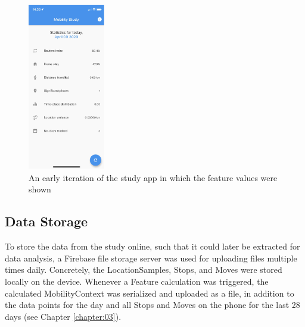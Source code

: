 \begin{figure}[h]
    \centering
    \includegraphics[width=0.3\textwidth]{images/app_imgs/screens-features.pdf}
    \caption{An early iteration of the study app in which the feature values were shown}
    \label{fig:app-features-screen}
\end{figure}

\subsection{Data Storage}
To store the data from the study online, such that it could later be extracted for data analysis, a Firebase file storage server was used for uploading files multiple times daily. Concretely, the LocationSamples, Stops, and Moves were stored locally on the device. Whenever a Feature calculation was triggered, the calculated MobilityContext was serialized and uploaded as a file, in addition to the data points for the day and all Stops and Moves on the phone for the last 28 days (see Chapter \ref{chapter:03}).